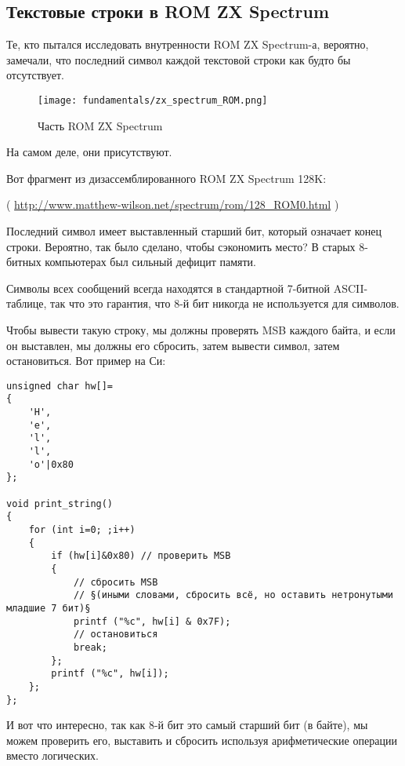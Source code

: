 \label{AND_OR_as_SUB_ADD}

\subsection{Текстовые строки в \ac{ROM} ZX Spectrum}

Те, кто пытался исследовать внутренности \ac{ROM} ZX Spectrum-а, вероятно, замечали,
что последний символ каждой текстовой строки как будто бы отсутствует.

\begin{figure}[H]
\centering
\texttt{[image: fundamentals/zx\_spectrum\_ROM.png]}
\caption{Часть \ac{ROM} ZX Spectrum}
\end{figure}

На самом деле, они присутствуют.

Вот фрагмент из дизассемблированного \ac{ROM} ZX Spectrum 128K:


( \url{http://www.matthew-wilson.net/spectrum/rom/128_ROM0.html} )

Последний символ имеет выставленный старший бит, который означает конец строки.
Вероятно, так было сделано, чтобы сэкономить место?
В старых 8-битных компьютерах был сильный дефицит памяти.

Символы всех сообщений всегда находятся в стандартной 7-битной \ac{ASCII}-таблице, так что это гарантия,
что 8-й бит никогда не используется для символов.

Чтобы вывести такую строку, мы должны проверять \ac{MSB} каждого байта, и если он выставлен, мы должны его сбросить,
затем вывести символ, затем остановиться.
Вот пример на Си:

\begin{lstlisting}[style=customc]
unsigned char hw[]=
{
	'H',
	'e',
	'l',
	'l',
	'o'|0x80
};

void print_string()
{
	for (int i=0; ;i++)
	{
		if (hw[i]&0x80) // проверить MSB
		{
			// сбросить MSB
			// §(иными словами, сбросить всё, но оставить нетронутыми младшие 7 бит)§
			printf ("%c", hw[i] & 0x7F);
			// остановиться
			break;
		};
		printf ("%c", hw[i]);
	};
};
\end{lstlisting}

И вот что интересно, так как 8-й бит это самый старший бит (в байте), мы можем проверить его, выставить и сбросить
используя арифметические операции вместо логических.

